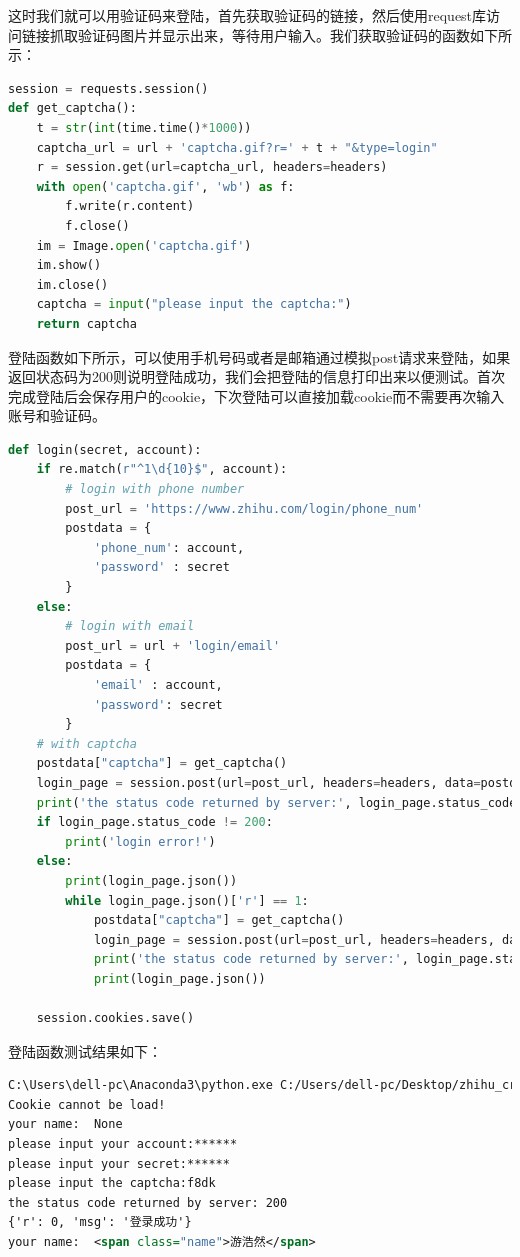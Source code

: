 \documentclass[UTF-8,a4paper, 12pt]{article}
\numberwithin{equation}{section}
\begin{document}
这时我们就可以用验证码来登陆，首先获取验证码的链接，然后使用request库访问链接抓取验证码图片并显示出来，等待用户输入。我们获取验证码的函数如下所示：
\begin{lstlisting}[language=python]
session = requests.session()
def get_captcha():
    t = str(int(time.time()*1000))
    captcha_url = url + 'captcha.gif?r=' + t + "&type=login"
    r = session.get(url=captcha_url, headers=headers)
    with open('captcha.gif', 'wb') as f:
        f.write(r.content)
        f.close()
    im = Image.open('captcha.gif')
    im.show()
    im.close()
    captcha = input("please input the captcha:")
    return captcha
\end{lstlisting}

登陆函数如下所示，可以使用手机号码或者是邮箱通过模拟post请求来登陆，如果返回状态码为200则说明登陆成功，我们会把登陆的信息打印出来以便测试。首次完成登陆后会保存用户的cookie，下次登陆可以直接加载cookie而不需要再次输入账号和验证码。
\begin{lstlisting}[language=python]
def login(secret, account):
    if re.match(r"^1\d{10}$", account):
        # login with phone number
        post_url = 'https://www.zhihu.com/login/phone_num'
        postdata = {
            'phone_num': account,
            'password' : secret
        }
    else:
        # login with email
        post_url = url + 'login/email'
        postdata = {
            'email' : account,
            'password': secret
        }
    # with captcha
    postdata["captcha"] = get_captcha()
    login_page = session.post(url=post_url, headers=headers, data=postdata)
    print('the status code returned by server:', login_page.status_code)
    if login_page.status_code != 200:
        print('login error!')
    else:
        print(login_page.json())
        while login_page.json()['r'] == 1:
            postdata["captcha"] = get_captcha()
            login_page = session.post(url=post_url, headers=headers, data=postdata)
            print('the status code returned by server:', login_page.status_code)
            print(login_page.json())

    session.cookies.save()
\end{lstlisting}
登陆函数测试结果如下：
\vspace{1.3cm}
\begin{lstlisting}[language=XML]
C:\Users\dell-pc\Anaconda3\python.exe C:/Users/dell-pc/Desktop/zhihu_crawler_py3/login.py
Cookie cannot be load!
your name:  None
please input your account:******
please input your secret:******
please input the captcha:f8dk
the status code returned by server: 200
{'r': 0, 'msg': '登录成功'}
your name:  <span class="name">游浩然</span>
\end{lstlisting}
\end{document}
